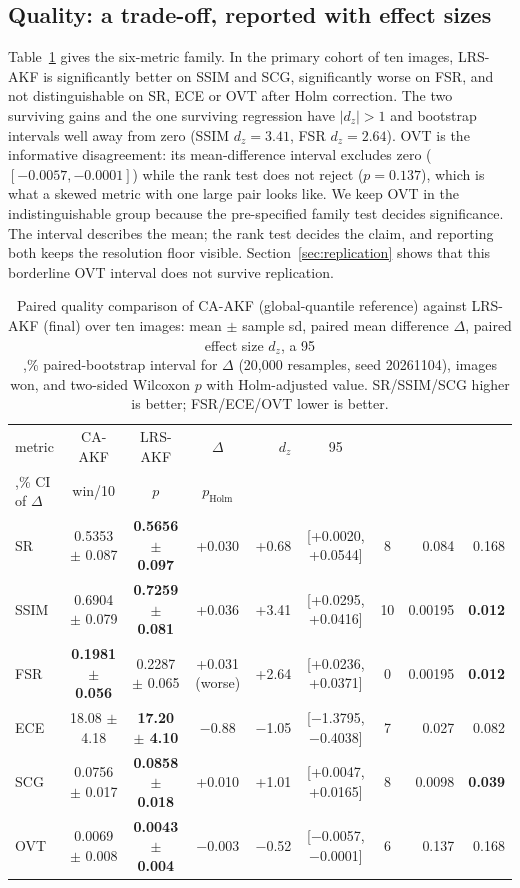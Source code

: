 \documentclass[journal]{IEEEtran}
\begin{document}
\subsection{Quality: a trade-off, reported with effect sizes}\label{quality-a-trade-off-reported-with-effect-sizes}

Table~\ref{tab:quality} gives the six-metric family. In the primary cohort of ten images, LRS-AKF is significantly better on SSIM and SCG, significantly worse on FSR, and not distinguishable on SR, ECE or OVT after Holm correction. The two surviving gains and the one surviving regression have \(|d_z|>1\) and bootstrap intervals well away from zero (SSIM \(d_z=3.41\), FSR \(d_z=2.64\)). OVT is the informative disagreement: its mean-difference interval excludes zero (\([-0.0057,-0.0001]\)) while the rank test does not reject (\(p=0.137\)), which is what a skewed metric with one large pair looks like. We keep OVT in the indistinguishable group because the pre-specified family test decides significance. The interval describes the mean; the rank test decides the claim, and reporting both keeps the resolution floor visible. Section~\ref{sec:replication} shows that this borderline OVT interval does not survive replication.

\begin{table}[t]
\caption{Paired quality comparison of CA-AKF (global-quantile reference) against LRS-AKF (final) over ten images: mean $\pm$ sample sd, paired mean difference $\Delta$, paired effect size $d_z$, a 95\\,\% paired-bootstrap interval for $\Delta$ (20,000 resamples, seed 20261104), images won, and two-sided Wilcoxon $p$ with Holm-adjusted value. SR/SSIM/SCG higher is better; FSR/ECE/OVT lower is better.}
\label{tab:quality}
\centering
\footnotesize
\begin{tabular}{@{}lcccrccrr@{}}
\toprule
metric & CA-AKF & LRS-AKF & $\Delta$ & $d_z$ & 95\\,\% CI of $\Delta$ & win/10 & $p$ & $p_{\mathrm{Holm}}$ \\
\midrule
SR & 0.5353 $\pm$ 0.087 & \textbf{0.5656 $\pm$ 0.097} & +0.030 & +0.68 & [+0.0020, +0.0544] & 8 & 0.084 & 0.168 \\
SSIM & 0.6904 $\pm$ 0.079 & \textbf{0.7259 $\pm$ 0.081} & +0.036 & +3.41 & [+0.0295, +0.0416] & 10 & 0.00195 & \textbf{0.012} \\
FSR & \textbf{0.1981 $\pm$ 0.056} & 0.2287 $\pm$ 0.065 & +0.031 (worse) & +2.64 & [+0.0236, +0.0371] & 0 & 0.00195 & \textbf{0.012} \\
ECE & 18.08 $\pm$ 4.18 & \textbf{17.20 $\pm$ 4.10} & $-$0.88 & $-$1.05 & [$-$1.3795, $-$0.4038] & 7 & 0.027 & 0.082 \\
SCG & 0.0756 $\pm$ 0.017 & \textbf{0.0858 $\pm$ 0.018} & +0.010 & +1.01 & [+0.0047, +0.0165] & 8 & 0.0098 & \textbf{0.039} \\
OVT & 0.0069 $\pm$ 0.008 & \textbf{0.0043 $\pm$ 0.004} & $-$0.003 & $-$0.52 & [$-$0.0057, $-$0.0001] & 6 & 0.137 & 0.168 \\
\bottomrule
\end{tabular}
\end{table}
\end{document}
